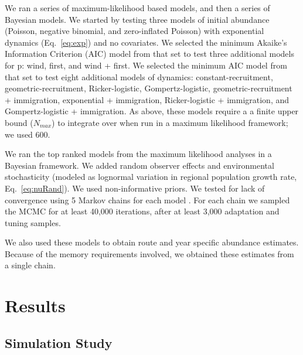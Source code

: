 \documentclass[12pt]{article}
\begin{document}
We ran a series of maximum-likelihood based models, 
and then a series of Bayesian models. We started by testing
three models of initial abundance (Poisson, negative binomial, and
zero-inflated Poisson) with exponential dynamics
(Eq.~\ref{eq:exp}) and no covariates.  We selected the minimum Akaike's Information
Criterion (AIC) model from that set to test three additional
models for p: wind, first, and wind + first. We selected the minimum
AIC model from that set to test eight additional models of dynamics:
constant-recruitment, geometric-recruitment, Ricker-logistic, Gompertz-logistic, geometric-recruitment +
immigration, exponential + immigration, Ricker-logistic +
immigration, and Gompertz-logistic + immigration. %
As above, these models require a a finite upper bound ($N_{max}$) to integrate
over when run in a maximum likelihood
framework; we used 600. %

We ran the top ranked models from the maximum likelihood
analyses in a Bayesian framework.  We added random observer 
effects and environmental stochasticity (modeled as lognormal
variation in regional population growth rate, Eq.~\ref{eq:nuRand}). %
We used
non-informative priors. We tested for lack of convergence using
5 Markov chains for each model \citep{gelman_rubin:1992}.
For each chain we sampled the MCMC for at least 40,000 iterations, after at
least 3,000 adaptation and tuning samples.  

We also used these models to obtain route and 
year specific abundance estimates.  Because of the memory requirements involved,
we obtained these estimates from a single chain.  %

\section{Results}

\subsection{Simulation Study}
\end{document}
